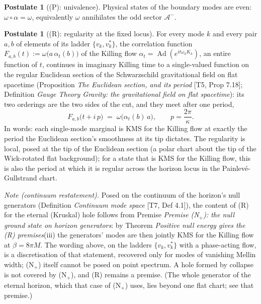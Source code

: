 \documentclass[11pt]{article}
\theoremstyle{definition}
\newtheorem{postulate}[theorem]{Postulate}
\theoremstyle{plain}
\providecommand{\Aod}{}\renewcommand{\Aod}{\mathcal{A}^{-}}
\begin{document}
\begin{postulate}[(P): univalence]\label{c:singularity.p-univalence}
Physical states of the boundary modes are even: $\omega \circ \alpha = \omega$, equivalently $\omega$ annihilates the odd sector $\Aod$.
\end{postulate}

\begin{postulate}[(R): regularity at the fixed locus]\label{c:singularity.r-regularity-fixed-locus}
For every mode $k$ and every pair $a, b$ of elements of its ladder $\{v_k, v_k^{*}\}$, the correlation function $F_{a,b}(t) := \omega\bigl(a\,\alpha_t(b)\bigr)$ of the Killing flow $\alpha_t = \operatorname{Ad}(e^{it\omega_k K_k})$, an entire function of $t$, continues in imaginary Killing time to a single-valued function on the regular Euclidean section of the Schwarzschild gravitational field on flat spacetime (Proposition \emph{The Euclidean section, and its period} [T5, Prop 7.18]; Definition \emph{Gauge Theory Gravity: the gravitational field on flat spacetime}): its two orderings are the two sides of the cut, and they meet after one period,
\[
F_{a,b}\bigl(t + i\,p\bigr) \;=\; \omega\bigl(\alpha_t(b)\,a\bigr), \qquad p = \frac{2\pi}{\kappa} .
\]
In words: each single-mode marginal is KMS for the Killing flow at exactly the period the Euclidean section's smoothness at its tip dictates. The regularity is local, posed at the tip of the Euclidean section (a polar chart about the tip of the Wick-rotated flat background); for a state that is KMS for the Killing flow, this is also the period at which it is regular across the horizon locus in the Painlev\'e-Gullstrand chart.

\emph{Note (continuum restatement).} Posed on the continuum of the horizon's null generators (Definition \emph{Continuum mode space} [T7, Def 4.1]), the content of (R) for the eternal (Kruskal) hole follows from Premise \emph{Premise (N$_{+}$): the null ground state on horizon generators}: by Theorem \emph{Positive null energy gives the (R) premises}(iii) the generators' modes are then jointly KMS for the Killing flow at $\beta = 8\pi M$. The wording above, on the ladders $\{v_{k}, v_{k}^{*}\}$ with a phase-acting flow, is a discretisation of that statement, recovered only for modes of vanishing Mellin width; (N$_{+}$) itself cannot be posed on point spectrum. A hole formed by collapse is not covered by (N$_{+}$), and (R) remains a premise. (The whole generator of the eternal horizon, which that case of (N$_{+}$) uses, lies beyond one flat chart; see that premise.)
\end{postulate}
\end{document}
